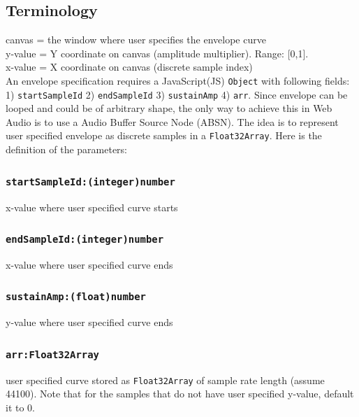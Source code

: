 \documentclass[20pt]{article}
\begin{document}
\subsection*{Terminology}
canvas = the window where user specifies the envelope curve\\
y-value = Y coordinate on canvas  (amplitude multiplier). Range: [0,1].\\
x-value = X coordinate on canvas (discrete sample index)\\

An envelope specification requires a JavaScript(JS) \texttt{Object} with following fields: 1) \texttt{startSampleId} 2) \texttt{endSampleId} 3) \texttt{sustainAmp} 4) \texttt{arr}. Since envelope can be looped and could be of arbitrary shape, the only way to achieve this in Web Audio is to use a Audio Buffer Source Node (ABSN). The idea is to represent user specified envelope as discrete samples in a \texttt{Float32Array}. Here is the definition of the parameters:

\subsubsection*{\texttt{startSampleId:(integer)\footnotemark[1] number}}
x-value where user specified curve starts\\
\subsubsection*{\texttt{endSampleId:(integer)\footnotemark[1] number}}
x-value where user specified curve ends\\
\subsubsection*{\texttt{sustainAmp:(float)\footnotemark[1] number}}
y-value where user specified curve ends\\
\subsubsection*{\texttt{arr:Float32Array} }
user specified curve stored as \texttt{Float32Array} of sample rate length (assume 44100). Note that for the samples that do not have user specified y-value, default it to 0.


\newpage
\end{document}
